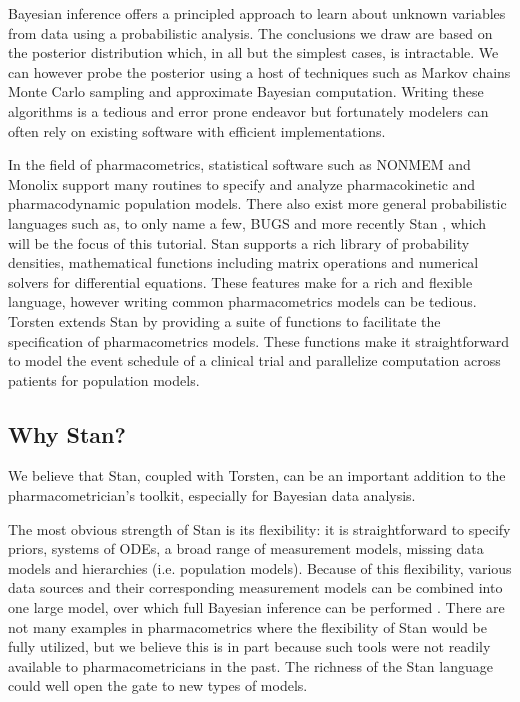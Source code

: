 
Bayesian inference offers a principled approach to learn about unknown variables from data using a probabilistic analysis.
The conclusions we draw are based on the posterior distribution which, in all but the simplest cases, is intractable.
We can however probe the posterior using a host of techniques such as Markov chains Monte Carlo sampling and approximate Bayesian computation.
Writing these algorithms is a tedious and error prone endeavor but fortunately modelers can often rely on existing software with efficient implementations.

In the field of pharmacometrics, statistical software such as NONMEM \cite{author:0000} and Monolix \cite{author:0000} support many routines to specify and analyze pharmacokinetic and pharmacodynamic population models.
There also exist more general probabilistic languages such as, to only name a few, BUGS \cite{author:0000} and more recently Stan \cite{Carpenter:2017}, which will be the focus of this tutorial.
Stan supports a rich library of probability densities, mathematical functions including matrix operations and numerical solvers for differential equations.
These features make for a rich and flexible language, however writing common pharmacometrics models can be tedious.
Torsten extends Stan by providing a suite of functions to facilitate the specification of pharmacometrics models.
These functions make it straightforward to model the event schedule of a clinical trial and parallelize computation across patients for population models.


\subsection{Why Stan?}

We believe that Stan, coupled with Torsten, can be an important addition to the pharmacometrician's toolkit, especially for Bayesian data analysis.

The most obvious strength of Stan is its flexibility: it is straightforward to specify priors, systems of ODEs, a broad range of measurement models, missing data models and hierarchies (i.e. population models).
Because of this flexibility, various data sources and their corresponding measurement models can be combined into one large model, over which full Bayesian inference can be performed \cite[e.g][]{Weber:2018}.
There are not many examples in pharmacometrics where the flexibility of Stan would be fully utilized, but we believe this is in part because such tools were not readily available to pharmacometricians in the past.
The richness of the Stan language could well open the gate to new types of models.

